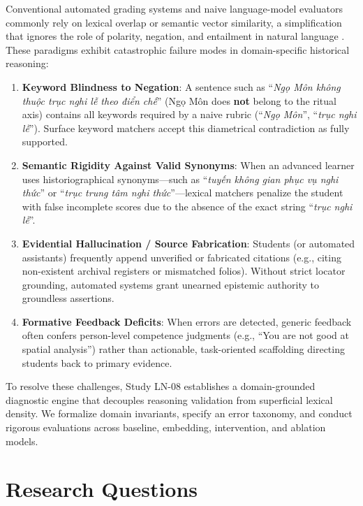 \documentclass[11pt,a4paper]{article}
\begin{document}
Conventional automated grading systems and naive language-model evaluators commonly rely on lexical overlap or semantic vector similarity, a simplification that ignores the role of polarity, negation, and entailment in natural language \cite{jurafsky2023speech}. These paradigms exhibit catastrophic failure modes in domain-specific historical reasoning:
\begin{enumerate}[leftmargin=*]
    \item \textbf{Keyword Blindness to Negation}: A sentence such as ``\textit{Ngọ Môn không thuộc trục nghi lễ theo điển chế}'' (Ngọ Môn does \textbf{not} belong to the ritual axis) contains all keywords required by a naive rubric (``\textit{Ngọ Môn}'', ``\textit{trục nghi lễ}''). Surface keyword matchers accept this diametrical contradiction as fully supported.
    \item \textbf{Semantic Rigidity Against Valid Synonyms}: When an advanced learner uses historiographical synonyms—such as ``\textit{tuyến không gian phục vụ nghi thức}'' or ``\textit{trục trung tâm nghi thức}''—lexical matchers penalize the student with false incomplete scores due to the absence of the exact string ``\textit{trục nghi lễ}''.
    \item \textbf{Evidential Hallucination / Source Fabrication}: Students (or automated assistants) frequently append unverified or fabricated citations (e.g., citing non-existent archival registers or mismatched folios). Without strict locator grounding, automated systems grant unearned epistemic authority to groundless assertions.
    \item \textbf{Formative Feedback Deficits}: When errors are detected, generic feedback often confers person-level competence judgments (e.g., ``You are not good at spatial analysis'') rather than actionable, task-oriented scaffolding directing students back to primary evidence.
\end{enumerate}

To resolve these challenges, Study LN-08 establishes a domain-grounded diagnostic engine that decouples reasoning validation from superficial lexical density. We formalize domain invariants, specify an error taxonomy, and conduct rigorous evaluations across baseline, embedding, intervention, and ablation models.

\section{Research Questions}
\end{document}
